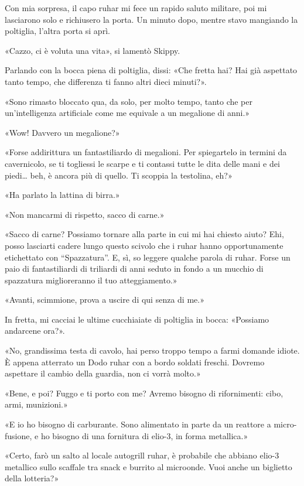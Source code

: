Con mia sorpresa, il capo ruhar mi fece un rapido saluto militare, poi
mi lasciarono solo e richiusero la porta. Un minuto dopo, mentre stavo
mangiando la poltiglia, l'altra porta si aprì.

«Cazzo, ci è voluta una vita», si lamentò Skippy.

Parlando con la bocca piena di poltiglia, dissi: «Che fretta hai? Hai
già aspettato tanto tempo, che differenza ti fanno altri dieci minuti?».

«Sono rimasto bloccato qua, da solo, per molto tempo, tanto che per
un'intelligenza artificiale come me equivale a un megalione di anni.»

«Wow! Davvero un megalione?»

«Forse addirittura un fantastiliardo di megalioni. Per spiegartelo in
termini da cavernicolo, se ti togliessi le scarpe e ti contassi tutte le
dita delle mani e dei piedi\ldots{} beh, è ancora più di quello. Ti
scoppia la testolina, eh?»

«Ha parlato la lattina di birra.»

«Non mancarmi di rispetto, sacco di carne.»

«Sacco di carne? Possiamo tornare alla parte in cui mi hai chiesto
aiuto? Ehi, posso lasciarti cadere lungo questo scivolo che i ruhar
hanno opportunamente etichettato con ``Spazzatura''. E, sì, so leggere
qualche parola di ruhar. Forse un paio di fantastiliardi di triliardi di
anni seduto in fondo a un mucchio di spazzatura miglioreranno il tuo
atteggiamento.»

«Avanti, scimmione, prova a uscire di qui senza di me.»

In fretta, mi cacciai le ultime cucchiaiate di poltiglia in bocca:
«Possiamo andarcene ora?».

«No, grandissima testa di cavolo, hai perso troppo tempo a farmi domande
idiote. È appena atterrato un Dodo ruhar con a bordo soldati freschi.
Dovremo aspettare il cambio della guardia, non ci vorrà molto.»

«Bene, e poi? Fuggo e ti porto con me? Avremo bisogno di rifornimenti:
cibo, armi, munizioni.»

«E io ho bisogno di carburante. Sono alimentato in parte da un reattore
a micro-fusione, e ho bisogno di una fornitura di elio-3, in forma
metallica.»

«Certo, farò un salto al locale autogrill ruhar, è probabile che abbiano
elio-3 metallico sullo scaffale tra snack e burrito al microonde. Vuoi
anche un biglietto della lotteria?»

